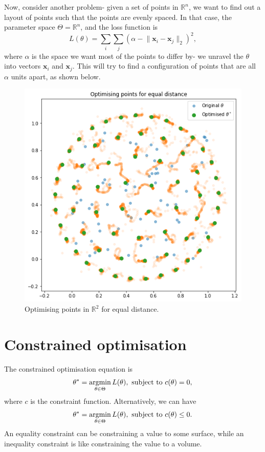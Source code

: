 \documentclass[a4paper, openany]{memoir}
\begin{document}
Now, consider another problem- given a set of points in $\mathbb{R}^n$, we want to find out a layout of points such that the points are evenly spaced. In that case, the parameter space $\Theta = \mathbb{R}^n$, and the loss function is
\[L(\theta) = \sum_i \sum_j (\alpha - \lVert \mathbf{x}_i - \mathbf{x}_j \rVert_2)^2,\]
where $\alpha$ is the space we want most of the points to differ by- we unravel the $\theta$ into vectors $\mathbf{x}_i$ and $\mathbf{x}_j$. This will try to find a configuration of points that are all $\alpha$ units apart, as shown below.
\begin{figure}[H]
    \centering
    \includegraphics[scale=0.5]{src/4.3 optimising points for equal distance.png}
    \caption{Optimising points in $\mathbb{R}^2$ for equal distance.}
\end{figure}

\section{Constrained optimisation}
The constrained optimisation equation is
\[\theta^* = \operatornamewithlimits{arg min}_{\theta \in \Theta} L(\theta), \text{ subject to } c(\theta) = 0,\]
where $c$ is the constraint function. Alternatively, we can have
\[\theta^* = \operatornamewithlimits{arg min}_{\theta \in \Theta} L(\theta), \text{ subject to } c(\theta) \leq 0.\]
An equality constraint can be constraining a value to some surface, while an inequality constraint is like constraining the value to a volume.
\end{document}
